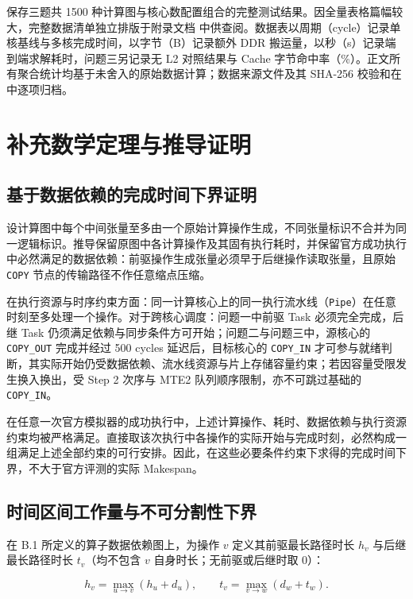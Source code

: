 \documentclass[anonymous,withtoc]{gmcm2026}
\begin{document}
\texttt{} 保存三题共 1500 种计算图与核心数配置组合的完整测试结果。因全量表格篇幅较大，完整数据清单独立排版于附录文档 \texttt{} 中供查阅。数据表以周期（cycle）记录单核基线与多核完成时间，以字节（B）记录额外 DDR 搬运量，以秒（s）记录端到端求解耗时，问题三另记录无 L2 对照结果与 Cache 字节命中率（\%）。正文所有聚合统计均基于未舍入的原始数据计算；数据来源文件及其 SHA-256 校验和在 \texttt{} 中逐项归档。

\section{补充数学定理与推导证明}

\subsection{基于数据依赖的完成时间下界证明}

设计算图中每个中间张量至多由一个原始计算操作生成，不同张量标识不合并为同一逻辑标识。推导保留原图中各计算操作及其固有执行耗时，并保留官方成功执行中必然满足的数据依赖：前驱操作生成张量必须早于后继操作读取张量，且原始 \texttt{COPY} 节点的传输路径不作任意缩点压缩。

在执行资源与时序约束方面：同一计算核心上的同一执行流水线（\texttt{Pipe}）在任意时刻至多处理一个操作。对于跨核心调度：问题一中前驱 Task 必须完全完成，后继 Task 仍须满足依赖与同步条件方可开始；问题二与问题三中，源核心的 \texttt{COPY\_OUT} 完成并经过 500 cycles 延迟后，目标核心的 \texttt{COPY\_IN} 才可参与就绪判断，其实际开始仍受数据依赖、流水线资源与片上存储容量约束；若因容量受限发生换入换出，受 Step 2 次序与 MTE2 队列顺序限制，亦不可跳过基础的 \texttt{COPY\_IN}。

在任意一次官方模拟器的成功执行中，上述计算操作、耗时、数据依赖与执行资源约束均被严格满足。直接取该次执行中各操作的实际开始与完成时刻，必然构成一组满足上述全部约束的可行安排。因此，在这些必要条件约束下求得的完成时间下界，不大于官方评测的实际 Makespan。

\subsection{时间区间工作量与不可分割性下界}

在 B.1 所定义的算子数据依赖图上，为操作 \(v\) 定义其前驱最长路径时长 \(h_v\) 与后继最长路径时长 \(t_v\)（均不包含 \(v\) 自身时长；无前驱或后继时取 0）：

\begin{equation}
h_v = \max_{u \to v}(h_u + d_u), \qquad t_v = \max_{v \to w}(d_w + t_w).
\end{equation}
\end{document}

